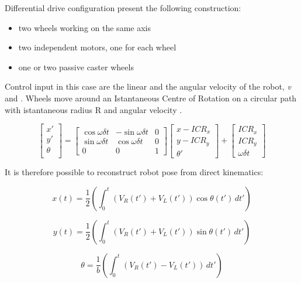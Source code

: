 Differential drive configuration present the following construction:
\begin{itemize}
    \item two wheels working on the same axis
    \item two independent motors, one for each wheel
    \item one or two passive caster wheels
\end{itemize}

Control input in this case are the linear and the angular velocity of the robot, \textit{v} and {\textomega}.
Wheels move around an Istantaneous Centre of Rotation on a circular path with istantaneous radius R and angular velocity \textomega.

\begin{equation}
    \begin{bmatrix}
    x' \\
    y' \\
    \theta \\
    \end{bmatrix} = \begin{bmatrix}
    \cos{\omega \delta t} & -\sin{\omega \delta t} & 0 \\
    \sin{\omega \delta t} & \cos{\omega \delta t} & 0 \\
    0 & 0 & 1
    \end{bmatrix}\begin{bmatrix}
    x - ICR_{x} \\
    y - ICR_{y} \\ 
    \theta'    \end{bmatrix} + \begin{bmatrix}
    ICR_{x} \\
    ICR_{y} \\
    \omega \delta t
    \end{bmatrix}
\end{equation}

It is therefore possible to reconstruct robot pose from direct kinematics:

\begin{equation}
    x(t) = \frac{1}{2}(\int_{0}^{t} (V_{R}(t') + V_{L}(t')) \cos{\theta(t')} \,dt')
\end{equation}

\begin{equation}
    y(t) = \frac{1}{2}(\int_{0}^{t} (V_{R}(t') + V_{L}(t')) \sin{\theta(t')} \,dt')
\end{equation}

\begin{equation}
    \theta = \frac{1}{b}(\int_{0}^{t} (V_{R}(t') - V_{L}(t')) \,dt')
\end{equation}


